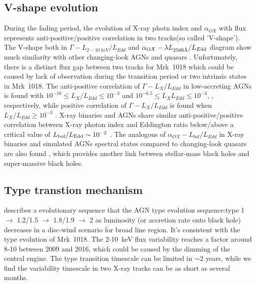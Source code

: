 \documentclass{aastex63}
\newcommand{\angstrom}{\text{\normalfont\AA}}
\begin{document}


\subsection{V-shape evolution}
During the fading period, the evolution of X-ray photn index and $\alpha_{OX}$ with flux represents anti-positive/positive correlation in two tracks(so called 'V-shape'). The V-shape both in $\Gamma-L_{2-10~keV}/L_{Edd}$ and $\alpha_{OX}-\lambda L_{2500\angstrom}/L_{Edd}$ diagram show much similarity with other changing-look AGNs \citep[see ][]{2019arXiv190904676R} and quasars \citep[see ][]{2019ApJ...883...76R}. Unfortunately, there is a distinct flux gap between two tracks for Mrk~1018 which could be caused by lack of observation during the transition period or two intrinsic states in Mrk~1018. The anti-positive correlation of $\Gamma-L_X/L_{Edd}$ in low-accreting AGNs is found with $10^{-10}\leq L_X/L_{Edd} \leq 10^{-3}$ and $10^{-6.5}\leq L_XL_{Edd} \leq 10^{-3}$, \citep[see][]{2014MNRAS.443...72J,2015MNRAS.447.1692Y}, respectively, while positive correlation of $\Gamma-L_X/L_{Edd}$ is found when $L_X/L_{Edd} \geq 10^{-3}$ \citep[see][]{2015MNRAS.447.1692Y}. X-ray binaries and AGNs share similar anti-positive/positive correlation between X-ray photon index and Eddington ratio below/above a critical value of $L_{\rm bol}/L_{\rm Edd}\sim 10^{-2}$ \citep[e.g.,][and references therein]{2008ApJ...682..212W,2009MNRAS.399..349G,2015MNRAS.447.1692Y}. The analogous of $\alpha_{OX}-L_{bol}/L_{Edd}$ in X-ray binaries and simulated AGNs spectral states compared to changing-look quasars are also found \citep[see ][]{2011MNRAS.417..280S,2011MNRAS.413.2259S,2019ApJ...883...76R}, which provides another link between stellar-mass black holes and super-massive black holes.


\subsection{Type transtion mechanism}
\citet{2014MNRAS.438.3340E} describes a evolutionary sequence that the AGN type evolution sequence:type 1 $\to$ 1.2/1.5 $\to$ 1.8/1.9 $\to$ 2 as luminosity (or accretion rate onto black hole) decreases in a disc-wind scenario for broad line region. It's consistent with the type evolution of Mrk~1018. The 2-10~keV flux variability reaches a factor around 8-10 between 2009 and 2016, which could be caused by the dimming of the central engine. The type transition timescale can be limited in $\sim 2$ years, while we find the variability timescale in two X-ray tracks can be as short as several months. 
\end{document}
